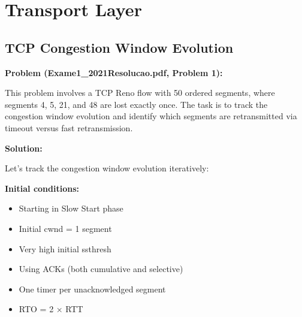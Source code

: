 \documentclass[11pt,a4paper]{article}
\begin{document}
\section{Transport Layer}

\subsection{TCP Congestion Window Evolution}
\textbf{Problem (Exame1\_2021Resolucao.pdf, Problem 1):}

This problem involves a TCP Reno flow with 50 ordered segments, where segments 4, 5, 21, and 48 are lost exactly once. The task is to track the congestion window evolution and identify which segments are retransmitted via timeout versus fast retransmission.

\textbf{Solution:}

Let's track the congestion window evolution iteratively:

\textbf{Initial conditions:}
\begin{itemize}
    \item Starting in Slow Start phase
    \item Initial cwnd = 1 segment
    \item Very high initial ssthresh
    \item Using ACKs (both cumulative and selective)
    \item One timer per unacknowledged segment
    \item RTO = 2 × RTT
\end{itemize}
\end{document}
